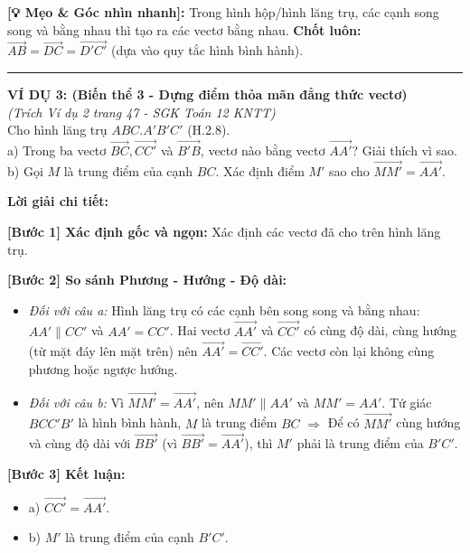 \documentclass[12pt,a4paper]{article}
\begin{document}
\begin{tcolorbox}[colback=white!95!black, colframe=myred, title=\textbf{KHỐI 4: CÁC VÍ DỤ MINH HỌA MẪU (Phủ hết các biến thể)}]
    \noindent\textbf{[💡 Mẹo \& Góc nhìn nhanh]:} Trong hình hộp/hình lăng trụ, các cạnh song song và bằng nhau thì tạo ra các vectơ bằng nhau. \textbf{Chốt luôn:} \(\overrightarrow{AB} = \overrightarrow{DC} = \overrightarrow{D'C'}\) (dựa vào quy tắc hình bình hành).

    \vspace{0.5cm}
    \hrule
    \vspace{0.5cm}

    \textbf{VÍ DỤ 3: (Biến thể 3 - Dựng điểm thỏa mãn đẳng thức vectơ)} \\
    \textit{(Trích Ví dụ 2 trang 47 - SGK Toán 12 KNTT)} \\
    Cho hình lăng trụ \(ABC.A'B'C'\) (H.2.8). \\
    a) Trong ba vectơ \(\overrightarrow{BC}, \overrightarrow{CC'}\) và \(\overrightarrow{B'B}\), vectơ nào bằng vectơ \(\overrightarrow{AA'}\)? Giải thích vì sao. \\
    b) Gọi \(M\) là trung điểm của cạnh \(BC\). Xác định điểm \(M'\) sao cho \(\overrightarrow{MM'} = \overrightarrow{AA'}\).
    
    \vspace{0.2cm}
    \textbf{\textcolor{myblue}{Lời giải chi tiết:}}
    
    \textbf{[Bước 1] Xác định gốc và ngọn:} 
    Xác định các vectơ đã cho trên hình lăng trụ.
    
    \textbf{[Bước 2] So sánh Phương - Hướng - Độ dài:}
    \begin{itemize}[leftmargin=*, label=-]
        \item \textit{Đối với câu a:} Hình lăng trụ có các cạnh bên song song và bằng nhau: \(AA' \parallel CC'\) và \(AA' = CC'\). Hai vectơ \(\overrightarrow{AA'}\) và \(\overrightarrow{CC'}\) có cùng độ dài, cùng hướng (từ mặt đáy lên mặt trên) nên \(\overrightarrow{AA'} = \overrightarrow{CC'}\). Các vectơ còn lại không cùng phương hoặc ngược hướng.
        \item \textit{Đối với câu b:} Vì \(\overrightarrow{MM'} = \overrightarrow{AA'}\), nên \(MM' \parallel AA'\) và \(MM' = AA'\). Tứ giác \(BCC'B'\) là hình bình hành, \(M\) là trung điểm \(BC\) \(\Rightarrow\) Để có \(\overrightarrow{MM'}\) cùng hướng và cùng độ dài với \(\overrightarrow{BB'}\) (vì \(\overrightarrow{BB'} = \overrightarrow{AA'}\)), thì \(M'\) phải là trung điểm của \(B'C'\).
    \end{itemize}
    
    \textbf{[Bước 3] Kết luận:}
    \begin{itemize}[leftmargin=*, label=-]
        \item a) \(\overrightarrow{CC'} = \overrightarrow{AA'}\).
        \item b) \(M'\) là trung điểm của cạnh \(B'C'\).
    \end{itemize}
    

\end{tcolorbox}
\end{document}
